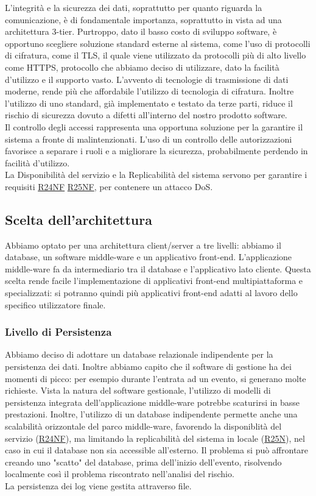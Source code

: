 \documentclass[a4paper]{article}
\begin{document}
L'integrità e la sicurezza dei dati, soprattutto per quanto riguarda la comunicazione, è di fondamentale importanza, soprattutto in vista ad una architettura 3-tier. Purtroppo, dato il basso costo di sviluppo software, è opportuno scegliere soluzione standard esterne al sistema, come l'uso di protocolli di cifratura, come il TLS, il quale viene utilizzato da protocolli più di alto livello come HTTPS, protocollo che abbiamo deciso di utilizzare, dato la facilità d'utilizzo e il supporto vasto. L'avvento di tecnologie di trasmissione di dati moderne, rende più che affordabile l'utilizzo di tecnologia di cifratura. Inoltre l'utilizzo di uno standard, già implementato e testato da terze parti, riduce il rischio di sicurezza dovuto a difetti all'interno del nostro prodotto software.\\Il controllo degli accessi rappresenta una opportuna soluzione per la garantire il sistema a fronte di malintenzionati. L'uso di un controllo delle autorizzazioni favorisce a separare i ruoli e a migliorare la sicurezza, probabilmente perdendo in facilità d'utilizzo.\\La Disponibilità del servizio e la Replicabilità del sistema servono per garantire i requisiti \hyperlink{R24NF}{R24NF} \hyperlink{R25NF}{R25NF}, per contenere un attacco DoS.


\subsection{Scelta dell'architettura}
Abbiamo optato per una architettura client/server a tre livelli: abbiamo il database, un software middle-ware e un applicativo front-end. L'applicazione middle-ware fa da intermediario tra il database e l'applicativo lato cliente. Questa scelta rende facile l'implementazione di applicativi front-end multipiattaforma e specializzati: si potranno quindi più applicativi front-end adatti al lavoro dello specifico utilizzatore finale.

\subsubsection{Livello di Persistenza}
Abbiamo deciso di adottare un database relazionale indipendente per la persistenza dei dati. Inoltre abbiamo capito che il software di gestione ha dei momenti di picco: per esempio durante l'entrata ad un evento, si generano molte richieste. Vista la natura del software gestionale, l'utilizzo di modelli di persistenza integrata dell'applicazione middle-ware potrebbe scaturirsi in basse prestazioni. Inoltre, l'utilizzo di un database indipendente permette anche una scalabilità orizzontale del parco middle-ware, favorendo la disponiblità del servizio (\hyperlink{R24NF}{R24NF}), ma limitando la replicabilità del sistema in locale (\hyperlink{R25NF}{R25N}), nel caso in cui il database non sia accessible all'esterno. Il problema si può affrontare creando uno "scatto" del database, prima dell'inizio dell'evento, risolvendo localmente così il problema riscontrato nell'analisi del rischio.\\La persistenza dei log viene gestita attraverso file.
\end{document}

